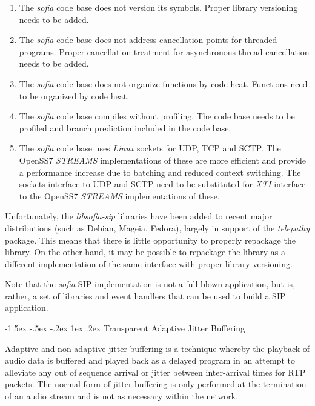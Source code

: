 \documentclass[letterpaper,final,notitlepage,twocolumn,10pt,twoside]{article}
\makeatletter
\let\normalsize = \small
\let\small = \footnotesize
\let\footnotesize = \scriptsize
\let\scriptsize = \tiny
\renewcommand\subsection{\@startsection{subsection}{2}{\z@}%
                                     {-1.5ex \@plus -.5ex \@minus -.2ex}%
                                     {1ex \@plus .2ex}%
                                     {\normalfont\normalsize\bfseries}}
\makeatother
\begin{document}
\begin{enumerate}

\item The {\sl sofia} code base does not version its symbols.  Proper library
versioning needs to be added.

\item The {\sl sofia} code base does not address cancellation points for
threaded programs.  Proper cancellation treatment for asynchronous thread
cancellation needs to be added.

\item The {\sl sofia} code base does not organize functions by code heat.
Functions need to be organized by code heat.

\item The {\sl sofia} code base compiles without profiling.  The code base
needs to be profiled and branch prediction included in the code base.

\item The {\sl sofia} code base uses {\sl Linux} sockets for UDP, TCP and
SCTP.  The OpenSS7 {\sl STREAMS} implementations of these are more efficient
and provide a performance increase due to batching and reduced context
switching.  The sockets interface to UDP and SCTP need to be substituted for
{\sl XTI} interface to the OpenSS7 {\sl STREAMS} implementations of these.

\end{enumerate}

Unfortunately, the {\sl libsofia-sip} libraries have been added to recent
major distributions (such as Debian, Mageia, Fedora), largely in support of
the {\sl telepathy} package.  This means that there is little opportunity to
properly repackage the library.  On the other hand, it may be possible to
repackage the library as a different implementation of the same interface with
proper library versioning.

Note that the {\sl sofia} SIP implementation is not a full blown application,
but is, rather, a set of libraries and event handlers that can be used to
build a SIP application.

\subsection{Transparent Adaptive Jitter Buffering}
\label{section:tajb}

Adaptive and non-adaptive jitter buffering is a technique whereby the playback
of audio data is buffered and played back as a delayed program in an attempt to
alleviate any out of sequence arrival or jitter between inter-arrival times for
RTP packets.  The normal form of jitter buffering is only performed at the
termination of an audio stream and is not as necessary within the network.
\end{document}

